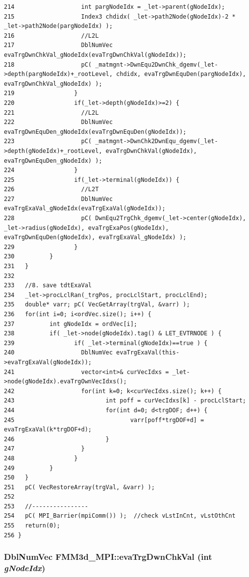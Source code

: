 \begin{verbatim}
214                   int pargNodeIdx = _let->parent(gNodeIdx);     
215                   Index3 chdidx( _let->path2Node(gNodeIdx)-2 * _let->path2Node(pargNodeIdx) );
216                   //L2L
217                   DblNumVec evaTrgDwnChkVal_gNodeIdx(evaTrgDwnChkVal(gNodeIdx));
218                   pC( _matmgnt->DwnEqu2DwnChk_dgemv(_let->depth(pargNodeIdx)+_rootLevel, chdidx, evaTrgDwnEquDen(pargNodeIdx), evaTrgDwnChkVal_gNodeIdx) );
219                 }
220                 if(_let->depth(gNodeIdx)>=2) {
221                   //L2L
222                   DblNumVec evaTrgDwnEquDen_gNodeIdx(evaTrgDwnEquDen(gNodeIdx));
223                   pC( _matmgnt->DwnChk2DwnEqu_dgemv(_let->depth(gNodeIdx)+_rootLevel, evaTrgDwnChkVal(gNodeIdx), evaTrgDwnEquDen_gNodeIdx) );
224                 }
225                 if(_let->terminal(gNodeIdx)) {
226                   //L2T
227                   DblNumVec evaTrgExaVal_gNodeIdx(evaTrgExaVal(gNodeIdx));
228                   pC( DwnEqu2TrgChk_dgemv(_let->center(gNodeIdx), _let->radius(gNodeIdx), evaTrgExaPos(gNodeIdx), evaTrgDwnEquDen(gNodeIdx), evaTrgExaVal_gNodeIdx) );
229                 }
230          }
231   }
232   
233   //8. save tdtExaVal
234   _let->procLclRan(_trgPos, procLclStart, procLclEnd);
235   double* varr; pC( VecGetArray(trgVal, &varr) );
236   for(int i=0; i<ordVec.size(); i++) {
237          int gNodeIdx = ordVec[i];
238          if( _let->node(gNodeIdx).tag() & LET_EVTRNODE ) {
239                 if( _let->terminal(gNodeIdx)==true ) {
240                   DblNumVec evaTrgExaVal(this->evaTrgExaVal(gNodeIdx));
241                   vector<int>& curVecIdxs = _let->node(gNodeIdx).evaTrgOwnVecIdxs();
242                   for(int k=0; k<curVecIdxs.size(); k++) {
243                          int poff = curVecIdxs[k] - procLclStart;
244                          for(int d=0; d<trgDOF; d++) {
245                                 varr[poff*trgDOF+d] = evaTrgExaVal(k*trgDOF+d);
246                          }
247                   }
248                 }
249          }
250   }
251   pC( VecRestoreArray(trgVal, &varr) );
252   
253   //----------------
254   pC( MPI_Barrier(mpiComm()) );  //check vLstInCnt, vLstOthCnt
255   return(0);
256 }
\end{verbatim}\normalsize 


\subsubsection{\setlength{\rightskip}{0pt plus 5cm}Dbl\-Num\-Vec FMM3d\_\-MPI::eva\-Trg\-Dwn\-Chk\-Val (int {\em g\-Node\-Idx})\hspace{0.3cm}{\tt  [protected]}}\label{classFMM3d__MPI_dc9b079c12b875033376654fb662682a_dc9b079c12b875033376654fb662682a}


